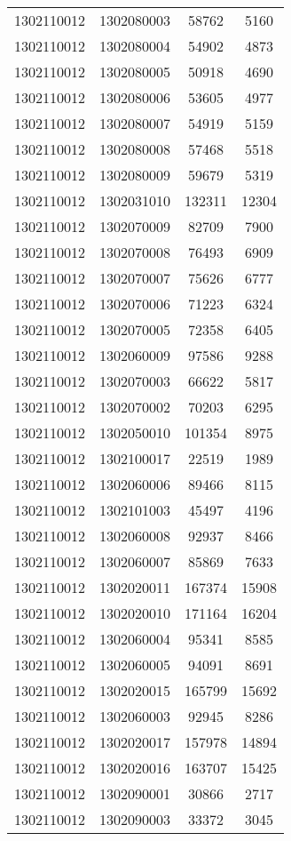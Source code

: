 \begin{longtable}[h]{llcc}
		1302110012 & 1302080003 & 58762 & 5160\\
		1302110012 & 1302080004 & 54902 & 4873\\
		1302110012 & 1302080005 & 50918 & 4690\\
		1302110012 & 1302080006 & 53605 & 4977\\
		1302110012 & 1302080007 & 54919 & 5159\\
		1302110012 & 1302080008 & 57468 & 5518\\
		1302110012 & 1302080009 & 59679 & 5319\\
		1302110012 & 1302031010 & 132311 & 12304\\
		1302110012 & 1302070009 & 82709 & 7900\\
		1302110012 & 1302070008 & 76493 & 6909\\
		1302110012 & 1302070007 & 75626 & 6777\\
		1302110012 & 1302070006 & 71223 & 6324\\
		1302110012 & 1302070005 & 72358 & 6405\\
		1302110012 & 1302060009 & 97586 & 9288\\
		1302110012 & 1302070003 & 66622 & 5817\\
		1302110012 & 1302070002 & 70203 & 6295\\
		1302110012 & 1302050010 & 101354 & 8975\\
		1302110012 & 1302100017 & 22519 & 1989\\
		1302110012 & 1302060006 & 89466 & 8115\\
		1302110012 & 1302101003 & 45497 & 4196\\
		1302110012 & 1302060008 & 92937 & 8466\\
		1302110012 & 1302060007 & 85869 & 7633\\
		1302110012 & 1302020011 & 167374 & 15908\\
		1302110012 & 1302020010 & 171164 & 16204\\
		1302110012 & 1302060004 & 95341 & 8585\\
		1302110012 & 1302060005 & 94091 & 8691\\
		1302110012 & 1302020015 & 165799 & 15692\\
		1302110012 & 1302060003 & 92945 & 8286\\
		1302110012 & 1302020017 & 157978 & 14894\\
		1302110012 & 1302020016 & 163707 & 15425\\
		1302110012 & 1302090001 & 30866 & 2717\\
		1302110012 & 1302090003 & 33372 & 3045\\

\end{longtable}
